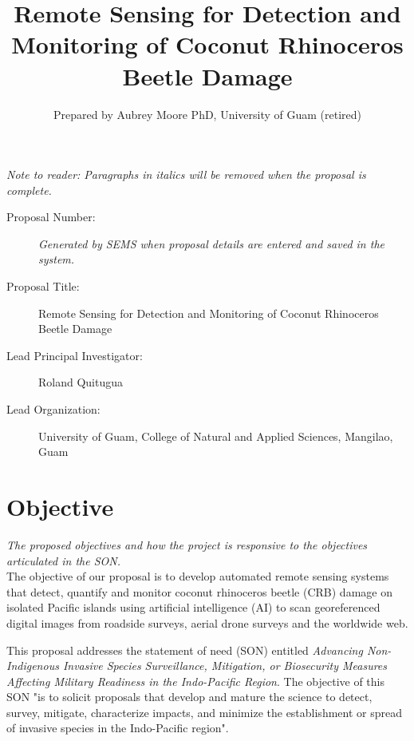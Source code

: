 \documentclass[11pt,english,letterpaper]{scrartcl}
\begin{document}
\titlehead{DRAFT SERDP FY25 PREPROPOSAL}
\title{Remote Sensing for Detection and Monitoring of Coconut Rhinoceros Beetle Damage}
\author{Prepared by Aubrey Moore PhD, University of Guam (retired)}

\maketitle

\tableofcontents{}\clearpage{}

\textit{Note to reader: Paragraphs in italics will be removed when the proposal is complete.}

\begin{description}
	
\item[Proposal Number:] \emph{Generated by SEMS when proposal details are entered and saved in the system.}

\item[Proposal Title:] Remote Sensing for Detection and Monitoring of Coconut Rhinoceros Beetle Damage

\item[Lead Principal Investigator:] Roland Quitugua

\item[Lead Organization:] University of Guam, College of Natural and Applied Sciences, Mangilao, Guam

\end{description}

\section{Objective}

\textit{The proposed objectives and how the project is responsive to the objectives
	articulated in the SON.}\\
	
The objective of our proposal is to develop automated remote sensing systems that detect, quantify and monitor coconut rhinoceros beetle (CRB) damage on isolated Pacific islands using artificial intelligence (AI) to scan georeferenced digital images from roadside surveys, aerial drone surveys and the worldwide web. 

This proposal addresses the statement of need (SON) entitled \textit{Advancing Non-Indigenous Invasive Species Surveillance, Mitigation, or Biosecurity Measures Affecting Military Readiness in the Indo-Pacific Region}. The objective of this SON "is to solicit proposals that develop and mature the science to detect, survey, mitigate, characterize impacts, and minimize the establishment or spread of invasive species in the Indo-Pacific region".
\end{document}
